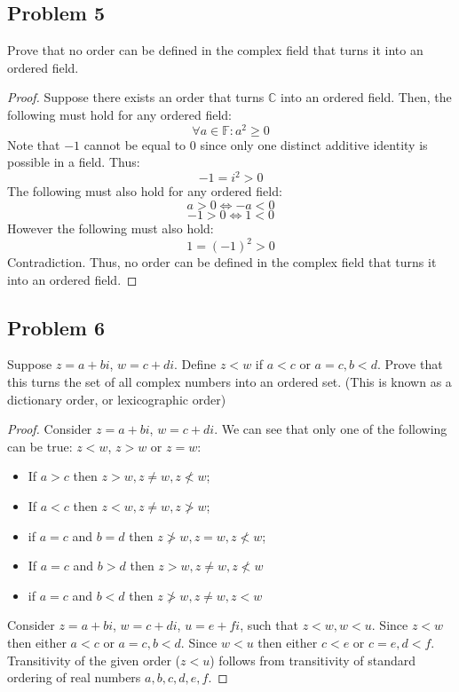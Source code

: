 \documentclass{article}
\begin{document}
\subsection*{Problem 5}

\begin{tcolorbox}
Prove that no order can be defined in the complex field that turns it into an ordered
field.
\end{tcolorbox}

\begin{proof}
Suppose there exists an order that turns $\mathbb{C}$ into an ordered field. Then, the following must hold for any ordered field:
$$\forall a \in \mathbb{F} : a^2 \geq 0$$
Note that $-1$ cannot be equal to $0$ since only one distinct additive identity is possible in a field. Thus:
$$-1 = i^2 > 0$$
 The following must also hold for any ordered field:
$$ a > 0 \iff -a < 0$$
$$ -1 > 0 \iff 1 < 0$$
However the following must also hold:
$$1 = (-1)^2 > 0$$
Contradiction. Thus, no order can be defined in the complex field that turns it into an ordered field.

\end{proof}

\subsection*{Problem 6}

\begin{tcolorbox}
Suppose $z = a + bi$, $w = c + di$. Define $z < w$ if $a < c$ or $a = c, b < d$. Prove that this turns the set of all complex numbers into an ordered set. (This is known as a dictionary order, or lexicographic order)
\end{tcolorbox}

\begin{proof}
Consider $z = a + bi$, $w = c + di$. We can see that only one of the following can be true: $z<w$, $z>w$ or $z=w$:
\begin{itemize}
\item If $a > c$ then $z>w, z \neq w, z \not< w$;
\item If $a < c$ then $z<w, z \neq w, z \not> w$;
\item if $a = c$ and $b = d$ then $z \not> w, z = w, z \not< w$;
\item If $a = c$ and $b > d$ then $z > w, z \neq w, z \not< w$
\item if $a = c$ and $b < d$ then $z \not> w, z \neq w, z < w$
\end{itemize}

Consider $z = a + bi$, $w = c + di$, $u = e + fi$, such that $z<w, w<u$. Since $z<w$  then either $a<c$ or $a=c, b<d$. Since $w<u$  then either $c<e$ or $c=e, d<f$. Transitivity of the given order ($z<u$) follows from transitivity of standard ordering of real numbers $a,b,c,d,e,f$.
\end{proof}
\end{document}
